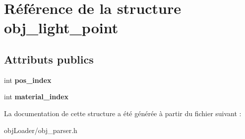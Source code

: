 \hypertarget{structobj__light__point}{\section{Référence de la structure obj\-\_\-light\-\_\-point}
\label{structobj__light__point}
}
\subsection*{Attributs publics}
\begin{DoxyCompactItemize}
\item 
\hypertarget{structobj__light__point_af1cc014add4a2347bfe42c679b045a33}{int {\bfseries pos\-\_\-index}}\label{structobj__light__point_af1cc014add4a2347bfe42c679b045a33}

\item 
\hypertarget{structobj__light__point_af1b77673d08020affbb95e3f0bf75f4a}{int {\bfseries material\-\_\-index}}\label{structobj__light__point_af1b77673d08020affbb95e3f0bf75f4a}

\end{DoxyCompactItemize}


La documentation de cette structure a été générée à partir du fichier suivant \-:\begin{DoxyCompactItemize}
\item 
obj\-Loader/obj\-\_\-parser.\-h\end{DoxyCompactItemize}
